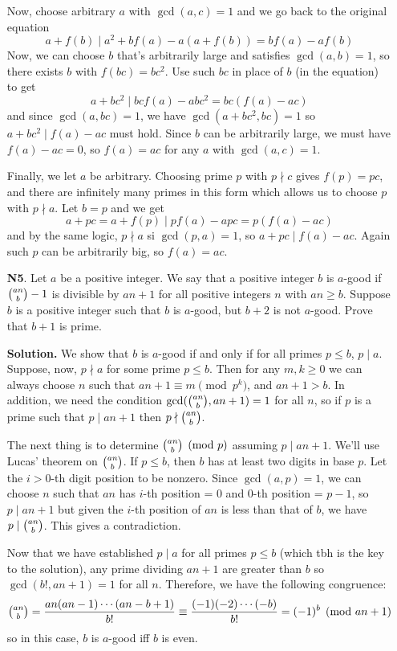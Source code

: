 \documentclass[11pt,a4paper]{article}
\begin{document}
\begin{enumerate}
	Now, choose arbitrary $a$ with $\gcd(a, c)=1$ and we go back to the original equation 
	\[
	a+f(b)\mid a^2+bf(a)-a(a+f(b))=bf(a)-af(b)
	\]
	Now, we can choose $b$ that's arbitrarily large and satisfies $\gcd(a, b)=1$, so there exists $b$ with $f(bc)=bc^2$. Use such $bc$ in place of $b$ (in the equation) to get 
	\[
	a+bc^2\mid bcf(a)-abc^2=bc(f(a)-ac)
	\]
	and since $\gcd(a, bc)=1$, we have $\gcd(a+bc^2, bc)=1$ so $a+bc^2\mid f(a)-ac$ must hold. Since $b$ can be arbitrarily large, we must have $f(a)-ac=0$, so $f(a)=ac$ for any $a$ with $\gcd(a, c)=1$. 
	
	Finally, we let $a$ be arbitrary. Choosing prime $p$ with $p\nmid c$ gives $f(p)=pc$, and there are infinitely many primes in this form which allows us to choose $p$ with $p\nmid a$. Let $b=p$ and we get 
	\[
	a+pc=a+f(p)\mid pf(a)-apc=p(f(a)-ac)
	\]
	and by the same logic, $p\nmid a$ si $\gcd(p, a)=1$, so $a+pc\mid f(a)-ac$. Again such $p$ can be arbitrarily big, so $f(a)=ac$. 
	
	
	\item[\textbf{N5}.] Let $a$ be a positive integer. We say that a positive integer $b$ is $a$-good if $\tbinom{an}{b}-1$ is divisible by $an+1$ for all positive integers $n$ with $an \geq b$. Suppose $b$ is a positive integer such that $b$ is $a$-good, but $b+2$ is not $a$-good. Prove that $b+1$ is prime.
	
	\textbf{Solution.} We show that $b$ is $a$-good if and only if for all primes $p\le b$, $p\mid a$. Suppose, now, $p\nmid a$ for some prime $p\le b$. Then for any $m, k\ge 0$ we can always choose $n$ such that $an+1\equiv m\pmod{p^k}$, and $an+1>b$. In addition, we need the condition $\gcd(\tbinom{an}{b}, an+1)=1$ for all $n$, so if $p$ is a prime such that $p\mid an+1$ then $p\nmid \tbinom{an}{b}$.
	
	The next thing is to determine $\tbinom{an}{b}\pmod{p}$ assuming $p\mid an+1$. We'll use Lucas' theorem on $\tbinom{an}{b}$. If $p\le b$, then $b$ has at least two digits in base $p$. Let the $i>0$-th digit position to be nonzero. Since $\gcd(a, p)=1$, we can choose $n$ such that $an$ has $i$-th position = 0 and $0$-th position = $p-1$, so $p\mid an+1$ but given the $i$-th position of $an$ is less than that of $b$, we have $p\mid \tbinom{an}{b}$. This gives a contradiction.
	
	Now that we have established $p\mid a$ for all primes $p\le b$ (which tbh is the key to the solution), any prime dividing $an+1$ are greater than $b$ so $\gcd(b!, an+1)=1$ for all $n$. Therefore, we have the following congruence:
	$$
	\tbinom{an}{b}=\frac{an(an-1)\cdots (an-b+1)}{b!}\equiv\frac{(-1)(-2)\cdots (-b)}{b!}=(-1)^b\pmod{an+1}
	$$so in this case, $b$ is $a$-good iff $b$ is even.
	

\end{enumerate}
\end{document}
